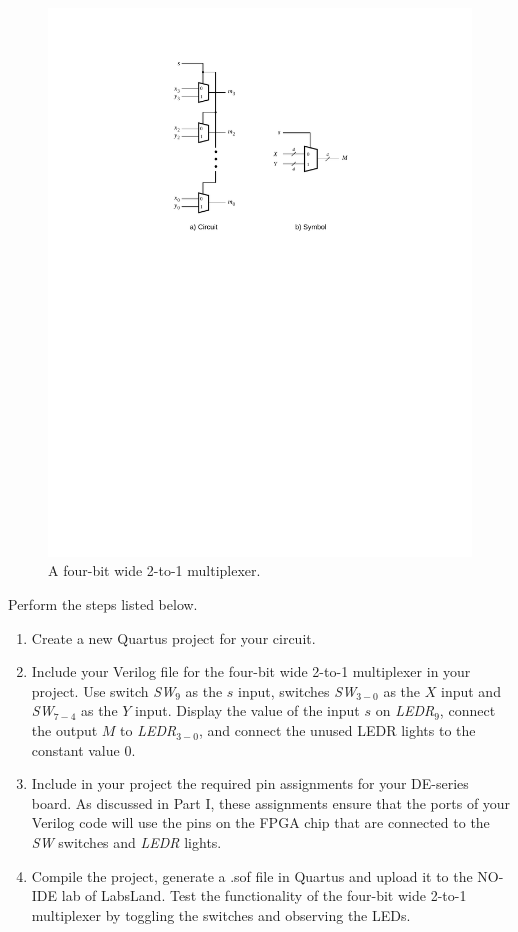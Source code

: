 \documentclass[epsfig,10pt,fullpage]{article}
\begin{document}
\begin{figure}[H]
	\begin{center}
		\includegraphics[scale=.8]{figures/figure3.pdf}
	\end{center}
\caption{A four-bit wide 2-to-1 multiplexer.}
\label{fig:3}
\end{figure}

Perform the steps listed below.
\begin{enumerate}
\item Create a new Quartus project for your circuit.
\item Include your Verilog file for the four-bit wide 2-to-1 multiplexer 
in your project. Use switch {\it SW}$_{9}$ as the $s$ input, switches
{\it SW}$_{3-0}$ as the $X$ input and 
{\it SW}$_{7-4}$ as the $Y$ input. Display the value of the input $s$ on {\it LEDR}$_9$,
connect the output $M$ to {\it LEDR}$_{3-0}$, and connect the unused LEDR lights to the constant value 0.
\item Include in your project the required pin assignments for your DE-series board. As discussed
in Part I, these assignments ensure that the ports of your Verilog code will use the pins 
on the FPGA chip that are connected to the {\it SW} switches and {\it LEDR} lights. 
\item Compile the project, generate a .sof file in Quartus and upload it to the NO-IDE lab of LabsLand.
Test the functionality of the 
four-bit wide 2-to-1 multiplexer by toggling the switches and observing the LEDs.
\end{enumerate}
\end{document}
